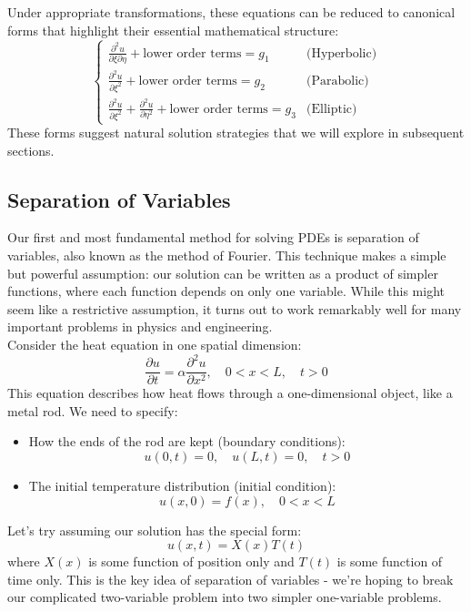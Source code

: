 \noindent Under appropriate transformations, these equations can be reduced to canonical forms that highlight their essential mathematical structure:
\[
\begin{cases}
\frac{\partial^2 u}{\partial \xi\partial \eta} + \text{lower order terms} = g_1 & \text{(Hyperbolic)} \\
\frac{\partial^2 u}{\partial \xi^2} + \text{lower order terms} = g_2 & \text{(Parabolic)} \\
\frac{\partial^2 u}{\partial \xi^2} + \frac{\partial^2 u}{\partial \eta^2} + \text{lower order terms} = g_3 & \text{(Elliptic)}
\end{cases}
\]
These forms suggest natural solution strategies that we will explore in subsequent sections.

\subsection*{Separation of Variables} 

\noindent Our first and most fundamental method for solving PDEs is separation of variables, also known as the method of Fourier. This technique makes a simple but powerful assumption: our solution can be written as a product of simpler functions, where each function depends on only one variable. While this might seem like a restrictive assumption, it turns out to work remarkably well for many important problems in physics and engineering. \\

\noindent Consider the heat equation in one spatial dimension:
\[
\frac{\partial u}{\partial t} = \alpha\frac{\partial^2 u}{\partial x^2}, \quad 0 < x < L, \quad t > 0
\]
This equation describes how heat flows through a one-dimensional object, like a metal rod. We need to specify:
\begin{itemize}
    \item How the ends of the rod are kept (boundary conditions):
    \[
    u(0,t) = 0, \quad u(L,t) = 0, \quad t > 0
    \]
    \item The initial temperature distribution (initial condition):
    \[
    u(x,0) = f(x), \quad 0 < x < L
    \]
\end{itemize}

\noindent Let's try assuming our solution has the special form:
\[
u(x,t) = X(x)T(t)
\]
where $X(x)$ is some function of position only and $T(t)$ is some function of time only. This is the key idea of separation of variables - we're hoping to break our complicated two-variable problem into two simpler one-variable problems. \\

